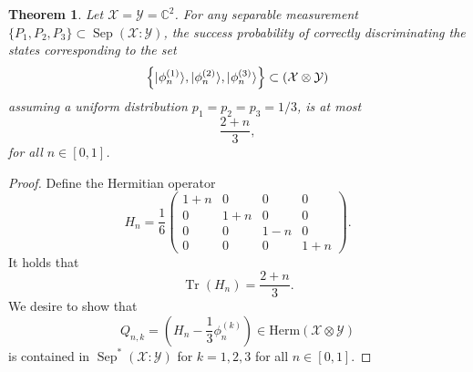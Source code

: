 \documentclass[11pt]{article}
\newtheorem{theorem}{Theorem}
\theoremstyle{definition}
\newcommand{\microspace}{\mspace{0.5mu}}
\newcommand{\tr}{\operatorname{Tr}}
\newcommand{\sep}{\operatorname{Sep}}
\newcommand{\ket}[1]{
  \lvert\microspace #1 \microspace \rangle}
\newcommand{\setft}[1]{\mathrm{#1}}
\newcommand{\Herm}{\setft{Herm}}
\newcommand{\complex}{\mathbb{C}}
\newcommand{\X}{\mathcal{X}}
\newcommand{\Y}{\mathcal{Y}}
\begin{document}
\begin{theorem}
    Let $\X = \Y = \complex^2$. For any separable measurement $\{ P_1, P_2, P_3
    \} \subset \sep(\X : \Y)$, the success probability of correctly
    discriminating the states corresponding to the set 
	\begin{equation}
        \left\{ 
            \ket{\phi_n^{(1)}},
            \ket{\phi_n^{(2)}},
            \ket{\phi_n^{(3)}}
        \right\} \subset 
        \left(\X \otimes \Y \right)
	\end{equation}
    assuming a uniform distribution $p_1 = p_2 = p_3 = 1/3$, is at most
    \begin{equation}
        \frac{2 + n}{3},
    \end{equation}
    for all $n \in [0, 1]$.
\end{theorem}
\begin{proof}
    Define the Hermitian operator
    \begin{equation}
        H_n = \frac{1}{6}
        \begin{pmatrix}
            1+n & 0 & 0 & 0 \\
            0 & 1+n & 0 & 0 \\
            0 & 0 & 1-n & 0 \\
            0 & 0 & 0 & 1+n
        \end{pmatrix}.
    \end{equation}
    It holds that
    \begin{equation}
        \tr(H_n) = \frac{2+n}{3}.
    \end{equation}
    We desire to show that
    \begin{equation}
        Q_{n,k} = \left(H_n - \frac{1}{3}\phi_n^{(k)}\right) \in \Herm(\X
        \otimes \Y)
    \end{equation}
    is contained in $\sep^*(\X : \Y)$ for $k = 1, 2, 3$ for all $n \in [0, 1]$.


\end{proof}
\end{document}
